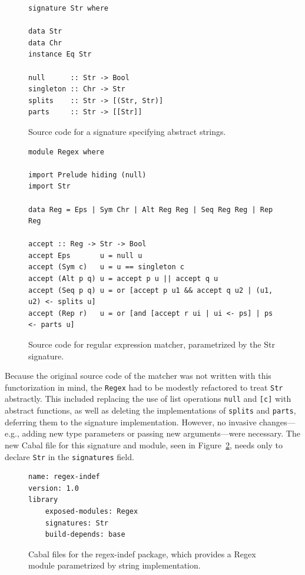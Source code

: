 \begin{figure}
\begin{verbatim}
signature Str where

data Str
data Chr
instance Eq Str

null      :: Str -> Bool
singleton :: Chr -> Str
splits    :: Str -> [(Str, Str)]
parts     :: Str -> [[Str]]
\end{verbatim}
\caption{Source code for a signature specifying abstract strings.}

\begin{verbatim}
module Regex where

import Prelude hiding (null)
import Str

data Reg = Eps | Sym Chr | Alt Reg Reg | Seq Reg Reg | Rep Reg

accept :: Reg -> Str -> Bool
accept Eps       u = null u
accept (Sym c)   u = u == singleton c
accept (Alt p q) u = accept p u || accept q u
accept (Seq p q) u = or [accept p u1 && accept q u2 | (u1, u2) <- splits u]
accept (Rep r)   u = or [and [accept r ui | ui <- ps] | ps <- parts u]
\end{verbatim}
\caption{Source code for regular expression matcher, parametrized by the Str signature.}
\label{fig:matcher-regex-indef-source}
\end{figure}

Because the original source code of the matcher was not written with
this functorization in mind, the \verb|Regex| had to be modestly
refactored to treat \verb|Str| abstractly.  This included replacing the
use of list operations \verb|null| and \verb|[c]| with abstract
functions, as well as deleting the implementations of \verb|splits| and
\verb|parts|, deferring them to the signature implementation.  However,
no invasive changes---e.g., adding new type parameters or passing new
arguments---were necessary.  The new Cabal file for this signature and
module, seen in Figure~\ref{fig:matcher-regex-indef-cabal}, needs only
to declare \verb|Str| in the \verb|signatures| field.

\begin{figure}
\begin{verbatim}
name: regex-indef
version: 1.0
library
    exposed-modules: Regex
    signatures: Str
    build-depends: base
\end{verbatim}
\caption{Cabal files for the regex-indef package, which provides a Regex
module parametrized by string implementation.}
\label{fig:matcher-regex-indef-cabal}
\end{figure}

